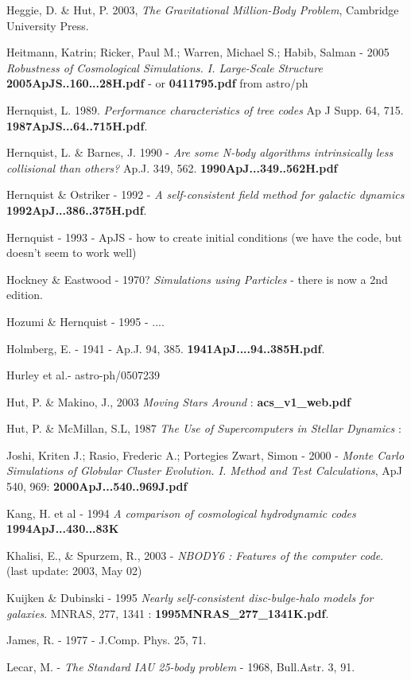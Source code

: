 {Heggie, D. \& Hut, P. 2003, 
{\it The Gravitational Million-Body Problem}, 
Cambridge University Press.

Heitmann, Katrin; Ricker, Paul M.; Warren, Michael S.; Habib, Salman - 2005
{\it Robustness of Cosmological Simulations. I. Large-Scale Structure}
{\bf 2005ApJS..160...28H.pdf} - or {\bf 0411795.pdf} from astro/ph

Hernquist, L. 1989. {\it Performance characteristics of tree codes} Ap J Supp. 64, 715.
{\bf 1987ApJS...64..715H.pdf}.

Hernquist, L. \& Barnes, J. 1990 - 
{\it Are some N-body algorithms intrinsically less collisional than others?}
Ap.J. 349,  562. {\bf 1990ApJ...349..562H.pdf}

Hernquist \& Ostriker - 1992 - {\it A self-consistent field method for galactic dynamics}
{\bf 1992ApJ...386..375H.pdf}.

Hernquist - 1993 - ApJS - how to create initial conditions (we have the code, but doesn't
seem to work well)

Hockney \& Eastwood - 1970? {\it Simulations using Particles} - there is now a 2nd edition.

Hozumi \& Hernquist - 1995 - ....

Holmberg, E. - 1941 - Ap.J. 94, 385.
{\bf 1941ApJ....94..385H.pdf}.

Hurley et al.- astro-ph/0507239

Hut, P. \& Makino, J., 2003  {\it Moving Stars Around} :
{\bf acs\_v1\_web.pdf}

Hut, P. \& McMillan, S.L, 1987  {\it The Use of Supercomputers in Stellar Dynamics} :

Joshi, Kriten J.; Rasio, Frederic A.; Portegies Zwart, Simon - 2000 -
{\it Monte Carlo Simulations of Globular Cluster Evolution. I. Method and Test Calculations},
ApJ 540, 969: 
{\bf 2000ApJ...540..969J.pdf}

Kang, H. et al - 1994
{\it A comparison of cosmological hydrodynamic codes}
{\bf 1994ApJ...430...83K}

Khalisi, E., \& Spurzem, R., 2003 - {\it NBODY6 : Features of the computer code}.
(last update: 2003, May 02)

Kuijken \& Dubinski - 1995 {\it Nearly self-consistent disc-bulge-halo models for galaxies}.
MNRAS, 277, 1341 : {\bf 1995MNRAS\_277\_1341K.pdf}.

James, R. - 1977 -  J.Comp. Phys. 25, 71.

Lecar, M. - {\it The Standard IAU 25-body problem} - 1968, Bull.Astr. 3, 91. 

}
